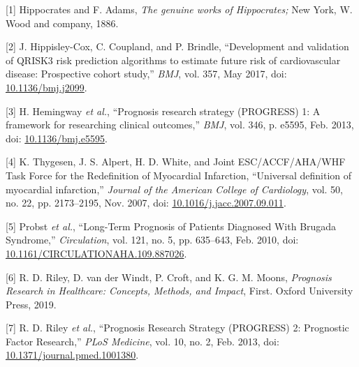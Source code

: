 \documentclass[12pt,PhD,twoside,openright]{muthesis}
\newenvironment{cslreferences}%
  {}%
  {\par}
\begin{document}


\noindent

\setlength{\parindent}{-0.20in}
\setlength{\leftskip}{0.20in}
\setlength{\parskip}{8pt}

\hypertarget{refs}{}
\begin{cslreferences}
\leavevmode\hypertarget{ref-hippocrates_genuine_1886}{}%
{[}1{]} Hippocrates and F. Adams, \emph{The genuine works of Hippocrates;} New York, W. Wood and company, 1886.

\leavevmode\hypertarget{ref-hippisley-cox_development_2017}{}%
{[}2{]} J. Hippisley-Cox, C. Coupland, and P. Brindle, ``Development and validation of QRISK3 risk prediction algorithms to estimate future risk of cardiovascular disease: Prospective cohort study,'' \emph{BMJ}, vol. 357, May 2017, doi: \href{https://doi.org/10.1136/bmj.j2099}{10.1136/bmj.j2099}.

\leavevmode\hypertarget{ref-hemingway_prognosis_2013}{}%
{[}3{]} H. Hemingway \emph{et al.}, ``Prognosis research strategy (PROGRESS) 1: A framework for researching clinical outcomes,'' \emph{BMJ}, vol. 346, p. e5595, Feb. 2013, doi: \href{https://doi.org/10.1136/bmj.e5595}{10.1136/bmj.e5595}.

\leavevmode\hypertarget{ref-thygesen_universal_2007}{}%
{[}4{]} K. Thygesen, J. S. Alpert, H. D. White, and Joint ESC/ACCF/AHA/WHF Task Force for the Redefinition of Myocardial Infarction, ``Universal definition of myocardial infarction,'' \emph{Journal of the American College of Cardiology}, vol. 50, no. 22, pp. 2173--2195, Nov. 2007, doi: \href{https://doi.org/10.1016/j.jacc.2007.09.011}{10.1016/j.jacc.2007.09.011}.

\leavevmode\hypertarget{ref-probst_long-term_2010}{}%
{[}5{]} Probst \emph{et al.}, ``Long-Term Prognosis of Patients Diagnosed With Brugada Syndrome,'' \emph{Circulation}, vol. 121, no. 5, pp. 635--643, Feb. 2010, doi: \href{https://doi.org/10.1161/CIRCULATIONAHA.109.887026}{10.1161/CIRCULATIONAHA.109.887026}.

\leavevmode\hypertarget{ref-riley_prognosis_2019}{}%
{[}6{]} R. D. Riley, D. van der Windt, P. Croft, and K. G. M. Moons, \emph{Prognosis Research in Healthcare: Concepts, Methods, and Impact}, First. Oxford University Press, 2019.

\leavevmode\hypertarget{ref-riley_prognosis_2013}{}%
{[}7{]} R. D. Riley \emph{et al.}, ``Prognosis Research Strategy (PROGRESS) 2: Prognostic Factor Research,'' \emph{PLoS Medicine}, vol. 10, no. 2, Feb. 2013, doi: \href{https://doi.org/10.1371/journal.pmed.1001380}{10.1371/journal.pmed.1001380}.


\end{cslreferences}
\end{document}
